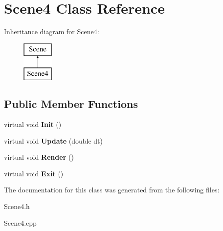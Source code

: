 \hypertarget{class_scene4}{\section{Scene4 Class Reference}
\label{class_scene4}
}
Inheritance diagram for Scene4\+:\begin{figure}[H]
\begin{center}
\leavevmode
\includegraphics[height=2.000000cm]{class_scene4}
\end{center}
\end{figure}
\subsection*{Public Member Functions}
\begin{DoxyCompactItemize}
\item 
\hypertarget{class_scene4_a3df44b08162c976706aa49ceef9e9f1a}{virtual void {\bfseries Init} ()}\label{class_scene4_a3df44b08162c976706aa49ceef9e9f1a}

\item 
\hypertarget{class_scene4_abfad5f484a4cc6e8a4b58c149e9ade21}{virtual void {\bfseries Update} (double dt)}\label{class_scene4_abfad5f484a4cc6e8a4b58c149e9ade21}

\item 
\hypertarget{class_scene4_aedb8a31e5bde1b6ad9d8127a0ac393da}{virtual void {\bfseries Render} ()}\label{class_scene4_aedb8a31e5bde1b6ad9d8127a0ac393da}

\item 
\hypertarget{class_scene4_a06cde399a3cda7d85d69773eb16237a9}{virtual void {\bfseries Exit} ()}\label{class_scene4_a06cde399a3cda7d85d69773eb16237a9}

\end{DoxyCompactItemize}


The documentation for this class was generated from the following files\+:\begin{DoxyCompactItemize}
\item 
Scene4.\+h\item 
Scene4.\+cpp\end{DoxyCompactItemize}
